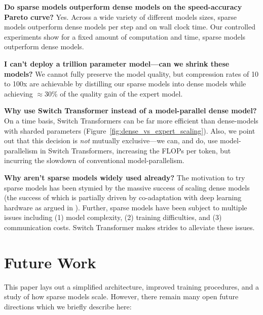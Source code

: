 \documentclass[twoside,11pt]{article}
\begin{document}
\textbf{Do sparse models outperform dense models on the speed-accuracy Pareto curve?}
Yes. Across a wide variety of different models sizes, sparse models outperform dense models per step and on wall clock time. Our controlled experiments show for a fixed amount of computation and time, sparse models outperform dense models. 


\textbf{I can't deploy a trillion parameter model---can we shrink these models?}
We cannot fully preserve the model quality, but compression rates of 10 to 100x are achievable by distilling our sparse models into dense models while achieving $\approx$30\% of the quality gain of the expert model.

\textbf{Why use Switch Transformer instead of a model-parallel dense model?} 
On a time basis, Switch Transformers can be far more efficient than dense-models with sharded parameters (Figure~\ref{fig:dense_vs_expert_scaling}).
Also, we point out that this decision is \emph{not} mutually exclusive---we can, and do, use model-parallelism in Switch Transformers, increasing the FLOPs per token, but incurring the slowdown of conventional model-parallelism.

\textbf{Why aren't sparse models widely used already?}
The motivation to try sparse models has been stymied by the massive success of scaling dense models (the success of which is partially driven by co-adaptation with deep learning hardware as argued in \cite{hooker2020hardware}). Further, sparse models have been subject to multiple issues including (1) model complexity, (2) training difficulties, and (3) communication costs.
Switch Transformer makes strides to alleviate these issues.




\section{Future Work}
This paper lays out a simplified architecture, improved training procedures, and a study of how sparse models scale.
However, there remain many open future directions which we briefly describe here:
\end{document}
